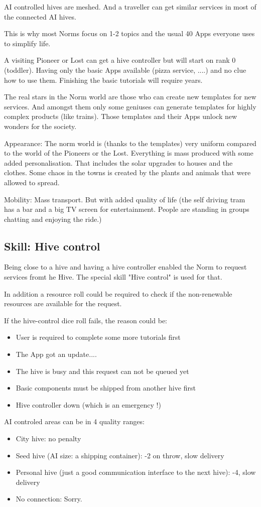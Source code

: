 AI controlled hives are meshed. And a traveller can get similar services in most of the connected AI hives.

This is why most Norms focus on 1-2 topics and the usual 40 Apps everyone uses to simplify life.

A visiting Pioneer or Lost can get a hive controller but will start on rank 0 (toddler). Having only the basic Apps available (pizza service, ....) and no clue how to use them. Finishing the basic tutorials will require years.

The real stars in the Norm world are those who can create new templates for new services. And amongst them only some geniuses can generate templates for highly complex products (like trains).
Those templates and their Apps unlock new wonders for the society.

Appearance: The norm world is (thanks to the templates) very uniform compared to the world of the Pioneers or the Lost. Everything is mass produced with some added personalisation. That includes the solar upgrades to houses and the clothes.
Some chaos in the towns is created by the plants and animals that were allowed to spread.

Mobility: Mass transport. But with added quality of life (the self driving tram has a bar and a big TV screen for entertainment. People are standing in groups chatting and enjoying the ride.)

\subsection{Skill: Hive control}

Being close to a hive and having a hive controller enabled the Norm to request services fromt he Hive. The special skill "Hive control" is used for that.

In addition a resource roll could be required to check if the non-renewable resources are available for the request.

If the hive-control dice roll fails, the reason could be:
\begin{itemize}
    \item User is required to complete some more tutorials first
    \item The App got an update....
    \item The hive is busy and this request can not be queued yet
    \item Basic components must be shipped from another hive first
    \item Hive controller down (which is an emergency !)
\end{itemize}

AI controled areas can be in 4 quality ranges:

\begin{itemize}
    \item City hive: no penalty
    \item Seed hive (AI size: a shipping container): -2 on throw, slow delivery
    \item Personal hive (just a good communication interface to the next hive): -4, slow delivery
    \item No connection: Sorry.
\end{itemize}
